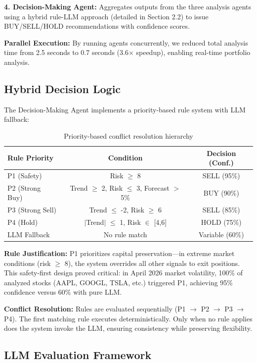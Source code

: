\documentclass[11pt,letterpaper]{article}
\begin{document}
\textbf{4. Decision-Making Agent:} Aggregates outputs from the three analysis agents using a hybrid rule-LLM approach (detailed in Section 2.2) to issue BUY/SELL/HOLD recommendations with confidence scores.

\textbf{Parallel Execution:} By running agents concurrently, we reduced total analysis time from 2.5 seconds to 0.7 seconds (3.6× speedup), enabling real-time portfolio analysis.

\subsection{Hybrid Decision Logic}

The Decision-Making Agent implements a priority-based rule system with LLM fallback:

\begin{table}[h]
\centering
\small
\begin{tabular}{@{}lcc@{}}
\toprule
\textbf{Rule Priority} & \textbf{Condition} & \textbf{Decision (Conf.)} \\
\midrule
P1 (Safety) & Risk $\geq$ 8 & SELL (95\%) \\
P2 (Strong Buy) & Trend $\geq$ 2, Risk $\leq$ 3, Forecast $>$ 5\% & BUY (90\%) \\
P3 (Strong Sell) & Trend $\leq$ -2, Risk $\geq$ 6 & SELL (85\%) \\
P4 (Hold) & $|$Trend$|$ $\leq$ 1, Risk $\in$ [4,6] & HOLD (75\%) \\
LLM Fallback & No rule match & Variable (60\%) \\
\bottomrule
\end{tabular}
\caption{Priority-based conflict resolution hierarchy}
\label{tab:rules}
\end{table}

\textbf{Rule Justification:} P1 prioritizes capital preservation—in extreme market conditions (risk $\geq$ 8), the system overrides all other signals to exit positions. This safety-first design proved critical: in April 2026 market volatility, 100\% of analyzed stocks (AAPL, GOOGL, TSLA, etc.) triggered P1, achieving 95\% confidence versus 60\% with pure LLM.

\textbf{Conflict Resolution:} Rules are evaluated sequentially (P1 $\rightarrow$ P2 $\rightarrow$ P3 $\rightarrow$ P4). The first matching rule executes deterministically. Only when no rule applies does the system invoke the LLM, ensuring consistency while preserving flexibility.

\subsection{LLM Evaluation Framework}
\end{document}
